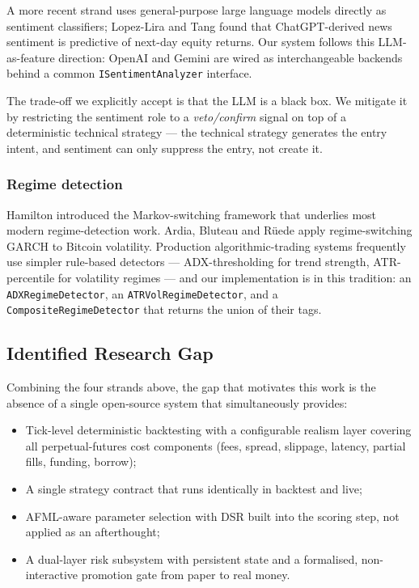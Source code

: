 \documentclass[a4paper, 12pt, titlepage]{article}
\begin{document}
A more recent strand uses general-purpose large language models
directly as sentiment classifiers; Lopez-Lira and Tang
\cite{lopez2023chatgpt} found that ChatGPT-derived news sentiment is
predictive of next-day equity returns. Our system follows this LLM-as-feature
direction: OpenAI and Gemini are wired as interchangeable backends
behind a common \texttt{ISentimentAnalyzer} interface.

The trade-off we explicitly accept is that the LLM is a black box.
We mitigate it by restricting the sentiment role to a \emph{veto/confirm}
signal on top of a deterministic technical strategy --- the technical
strategy generates the entry intent, and sentiment can only suppress
the entry, not create it.

\subsubsection*{Regime detection}

Hamilton \cite{hamilton1989regime} introduced the Markov-switching
framework that underlies most modern regime-detection work. Ardia,
Bluteau and Rüede \cite{ardia2019regime} apply regime-switching GARCH
to Bitcoin volatility. Production algorithmic-trading systems
frequently use simpler rule-based detectors --- ADX-thresholding for
trend strength, ATR-percentile for volatility regimes --- and our
implementation is in this tradition: an
\texttt{ADXRegimeDetector}, an \texttt{ATRVolRegimeDetector}, and a
\texttt{CompositeRegimeDetector} that returns the union of their
tags.

\subsection{Identified Research Gap}

Combining the four strands above, the gap that motivates this work is
the absence of a single open-source system that simultaneously
provides:

\begin{itemize}[noitemsep]
    \item Tick-level deterministic backtesting with a configurable
    realism layer covering all perpetual-futures cost components
    (fees, spread, slippage, latency, partial fills, funding,
    borrow);
    \item A single strategy contract that runs identically in
    backtest and live;
    \item AFML-aware parameter selection with DSR built into the
    scoring step, not applied as an afterthought;
    \item A dual-layer risk subsystem with persistent state and a
    formalised, non-interactive promotion gate from paper to real
    money.
\end{itemize}
\end{document}
